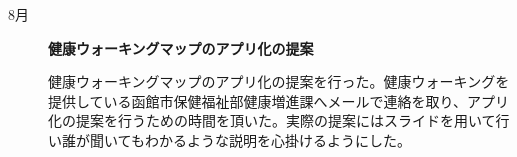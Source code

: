 ﻿\begin{description}
 \item[8月]
  \textbf{健康ウォーキングマップのアプリ化の提案}\par
 健康ウォーキングマップのアプリ化の提案を行った。健康ウォーキングを提供している函館市保健福祉部健康増進課へメールで連絡を取り、アプリ化の提案を行うための時間を頂いた。実際の提案にはスライドを用いて行い誰が聞いてもわかるような説明を心掛けるようにした。
  \par
\end{description}
